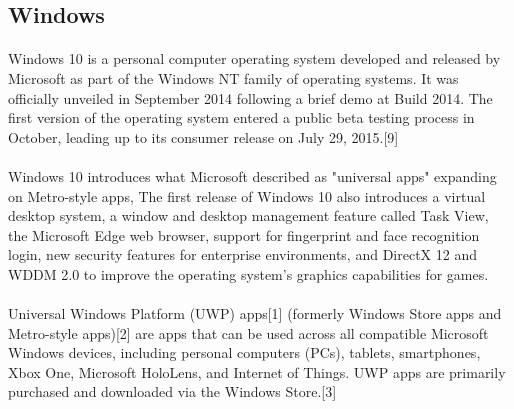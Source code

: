\subsection{Windows}

\paragraph{}
Windows 10 is a personal computer operating system developed and released by Microsoft as part of the Windows NT family of operating systems. It was officially unveiled in September 2014 following a brief demo at Build 2014. The first version of the operating system entered a public beta testing process in October, leading up to its consumer release on July 29, 2015.[9]

\paragraph{}
Windows 10 introduces what Microsoft described as "universal apps" expanding on Metro-style apps,
The first release of Windows 10 also introduces a virtual desktop system, a window and desktop management feature called Task View, the Microsoft Edge web browser, support for fingerprint and face recognition login, new security features for enterprise environments, and DirectX 12 and WDDM 2.0 to improve the operating system's graphics capabilities for games.

\paragraph{}
Universal Windows Platform (UWP) apps[1] (formerly Windows Store apps and Metro-style apps)[2] are apps that can be used across all compatible Microsoft Windows devices, including personal computers (PCs), tablets, smartphones, Xbox One, Microsoft HoloLens, and Internet of Things. UWP apps are primarily purchased and downloaded via the Windows Store.[3]

